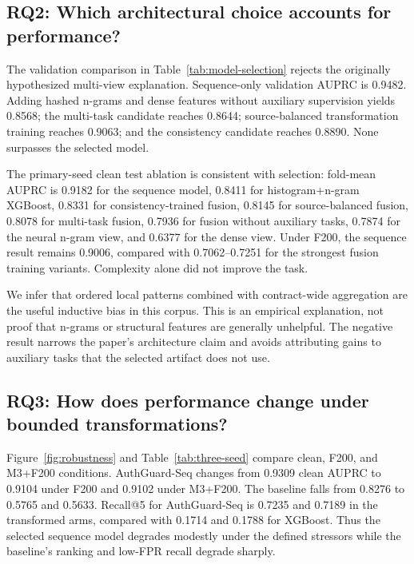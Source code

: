 \documentclass[conference]{IEEEtran}
\newcommand{\model}{AuthGuard-Seq}
\begin{document}


\subsection{RQ2: Which architectural choice accounts for performance?}

The validation comparison in Table~\ref{tab:model-selection} rejects the originally hypothesized
multi-view explanation. Sequence-only validation AUPRC is 0.9482. Adding hashed n-grams and dense
features without auxiliary supervision yields 0.8568; the multi-task candidate reaches 0.8644;
source-balanced transformation training reaches 0.9063; and the consistency candidate reaches
0.8890. None surpasses the selected model.

The primary-seed clean test ablation is consistent with selection: fold-mean AUPRC is 0.9182 for
the sequence model, 0.8411 for histogram+n-gram XGBoost, 0.8331 for consistency-trained fusion,
0.8145 for source-balanced fusion, 0.8078 for multi-task fusion, 0.7936 for fusion without
auxiliary tasks, 0.7874 for the neural n-gram view, and 0.6377 for the dense view. Under F200, the
sequence result remains 0.9006, compared with 0.7062--0.7251 for the strongest fusion training
variants. Complexity alone did not improve the task.

We infer that ordered local patterns combined with contract-wide aggregation are the useful
inductive bias in this corpus. This is an empirical explanation, not proof that n-grams or
structural features are generally unhelpful. The negative result narrows the paper's architecture
claim and avoids attributing gains to auxiliary tasks that the selected artifact does not use.

\subsection{RQ3: How does performance change under bounded transformations?}

Figure~\ref{fig:robustness} and Table~\ref{tab:three-seed} compare clean, F200, and M3+F200
conditions. \model{} changes from 0.9309 clean AUPRC to 0.9104 under F200 and 0.9102 under
M3+F200. The baseline falls from 0.8276 to 0.5765 and 0.5633. Recall@5 for \model{} is 0.7235 and
0.7189 in the transformed arms, compared with 0.1714 and 0.1788 for XGBoost. Thus the selected
sequence model degrades modestly under the defined stressors while the baseline's ranking and
low-FPR recall degrade sharply.
\end{document}

